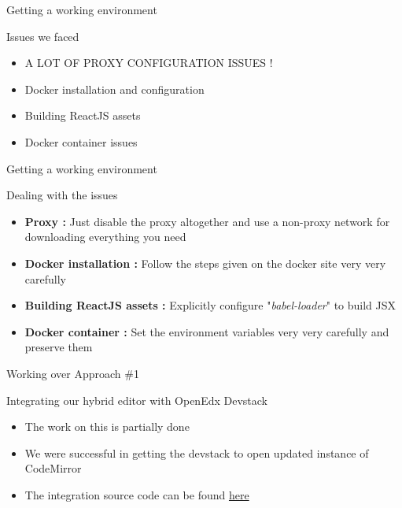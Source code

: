 \documentclass{beamer}
\begin{document}
	\begin{frame}{Getting a working environment}
		\begin{block}{Issues we faced}
			\begin{itemize}
				\item \alert{A LOT OF PROXY CONFIGURATION ISSUES !}
				\item Docker installation and configuration
				\item Building ReactJS assets
				\item Docker container issues
			\end{itemize}
		\end{block}
	\end{frame}
	
	\begin{frame}{Getting a working environment}
		\begin{block}{Dealing with the issues }
			\begin{itemize}
				\item \textbf{Proxy :} Just disable the proxy altogether and use a non-proxy network for downloading everything you need \pause
				\item \textbf{Docker installation : } Follow the steps given on the docker site very very carefully \pause
				\item \textbf{Building ReactJS assets : } Explicitly configure "\textit{babel-loader}" to build JSX \pause
				\item \textbf{Docker container : } Set the environment variables very very carefully and preserve them 
			\end{itemize}
		\end{block}
	\end{frame}
	
	\begin{frame}{Working over Approach \#1}
		\begin{block}{Integrating our hybrid editor with OpenEdx Devstack}
			\begin{itemize}
				\item The work on this is partially done
				\item We were successful in getting the devstack to open updated instance of CodeMirror
				\item The integration source code can be found \alert{\hyperlink{GitHub Link}{here}}
			\end{itemize}
		\end{block}
	\end{frame}
	
\end{document}
